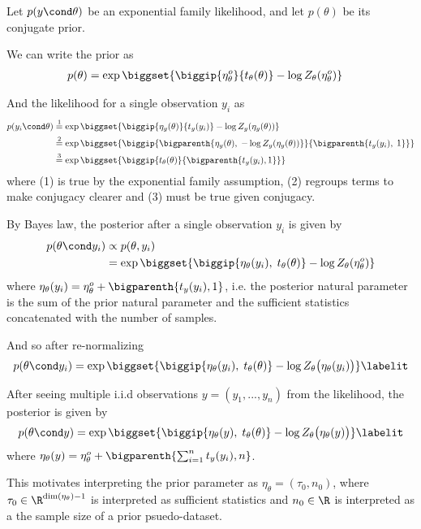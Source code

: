 Let $p(y \cond \theta)$ be an exponential family likelihood, and let $p(\theta)$ be its conjugate prior. 

We can write the prior as 
\begin{align*}
p(\theta ) &= \exp \biggset{\biggip{\eta_\theta^o}{t_\theta (\theta)} - \log Z_\theta(\eta_\theta^o)} 
\end{align*}

And the likelihood for a single observation $y_i$ as 
\begin{align*}
p(y_i \cond \theta)  & \stackrel{1}{=} \exp \biggset{ \biggip{\eta_y(\theta)}{t_y(y_i)} - \log Z_y (\eta_y(\theta)) } \\
& \stackrel{2}{=} \exp \biggset{ \biggip{ \bigparenth{\eta_y(\theta), \; - \log Z_y (\eta_y(\theta))}}{\bigparenth{t_y(y_i), \; 1}}  } \\
& \stackrel{3}{=} \exp \biggset{ \biggip{t_\theta(\theta)}{\bigparenth{t_y(y_i),1}}}   
\end{align*}
where (1) is true by the exponential family assumption, (2) regroups terms to make conjugacy clearer and (3) must be true given conjugacy. 


By Bayes law, the posterior after a single observation $y_i$ is given by
\begin{align*}
p(\theta \cond y_i)  &\propto p(\theta, y_i) \\
	&=\exp \biggset{ \biggip{ \eta_\theta(y_i), \;   t_\theta(\theta) }- \log Z_\theta(\eta_\theta^o)} 
\end{align*}
where $\eta_\theta(y_i) = \eta_\theta^o + \bigparenth{t_y(y_i),1}$, i.e. the posterior natural parameter is the sum of the prior natural parameter and the sufficient statistics concatenated with the number of samples. 

And so after re-normalizing
\begin{align*}
p(\theta \cond y_i)  = \exp \biggset{ \biggip{ \eta_\theta(y_i), \;   t_\theta(\theta) } - \log Z_\theta \big(\eta_\theta(y_i)\big)}
\labelit \label{eqn:posterior_for_exponential_family_after_one_obs} 
\end{align*}
  
After seeing multiple i.i.d observations $y=(y_1,...,y_n)$ from the likelihood, the posterior is given by
\begin{align*}
p(\theta \cond y)  = \exp \biggset{ \biggip{ \eta_\theta(y), \;   t_\theta(\theta) } - \log Z_\theta \big(\eta_\theta(y)\big)} 
\labelit \label{eqn:posterior_for_exponential_family_after_many_obs} 
\end{align*}
where $\eta_\theta(y) = \eta_\theta^o + \bigparenth{ \sum_{i=1}^n t_y(y_i),n}$.

This motivates interpreting the prior parameter as $\eta_\theta = (\tau_0, n_0)$, where $\tau_0 \in \R^{\dim(\eta_\theta) - 1}$ is interpreted as sufficient statistics and $n_0 \in \R$ is interpreted as a the sample size of a prior psuedo-dataset. 
